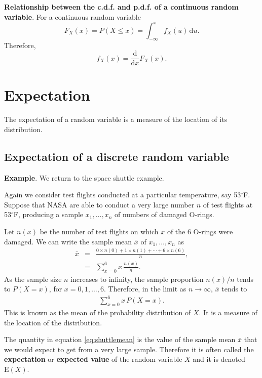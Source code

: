 \documentclass[
  11pt,
  british,
  openany, a4paper]{book}
\begin{document}
\textbf{Relationship between the c.d.f. and p.d.f. of a continuous random variable}. For a continuous random variable
\[ F_X(x) = P(X \leq x) = \int_{-\infty}^x f_X(u) \,\mathrm{d}u. \]
Therefore,
\[ f_X(x) = \frac{\mathrm{d}}{\mathrm{d}x} F_X(x). \]

\hypertarget{expectation}{%
\section{Expectation}\label{expectation}}

The expectation of a random variable is a measure of the location of its distribution.

\hypertarget{expectation-of-a-discrete-random-variable}{%
\subsection{Expectation of a discrete random variable}\label{expectation-of-a-discrete-random-variable}}

\textbf{Example}. We return to the space shuttle example.

Again we consider test flights conducted at a particular temperature, say 53\(^\circ\)F. Suppose that NASA are able to conduct a very large number \(n\) of test flights at 53\(^\circ\)F, producing a sample \(x_1,\ldots,x_n\) of numbers of damaged O-rings.

Let \(n(x)\) be the number of test flights on which \(x\) of the 6 O-rings were damaged. We can write the sample mean \(\bar{x}\) of \(x_1,\ldots,x_n\) as
\begin{eqnarray*}
\bar{x} &=& \frac{0 \times n(0) + 1 \times n(1) + \cdots + 6 \times n(6)}{n}, \\
&=& \sum_{x=0}^6 x\,\frac{n(x)}{n}.
\end{eqnarray*}
As the sample size \(n\) increases to infinity, the sample proportion \(n(x)/n\) tends to \(P(X=x)\), for \(x=0,1,\ldots,6\). Therefore, in the limit as \(n \rightarrow \infty\), \(\bar{x}\) tends to
\begin{eqnarray}
\sum_{x=0}^6 x\,P(X=x). 
\label{eq:shuttlemean}
\end{eqnarray}
This is known as the mean of the probability distribution of \(X\). It is a measure of the location of the distribution.

The quantity in equation \eqref{eq:shuttlemean} is the value of the sample mean \(\bar{x}\) that we would expect to get from a very large sample. Therefore it is often called the \textbf{expectation} or \textbf{expected value} of the random variable \(X\) and it is denoted \(\mathrm{E}(X)\).
\end{document}
